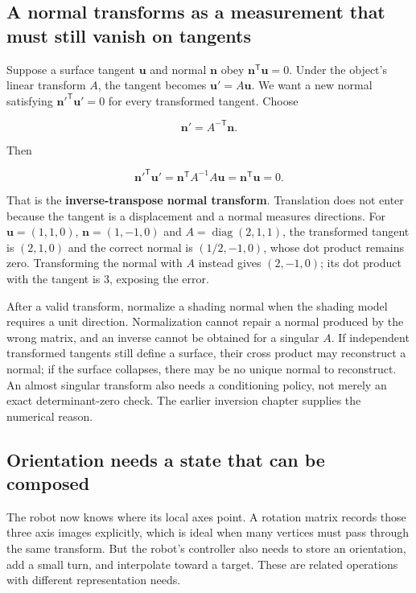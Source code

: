 \subsection{A normal transforms as a measurement that must still vanish on tangents}\label{a-normal-transforms-as-a-measurement-that-must-still-vanish-on-tangents}

Suppose a surface tangent \(\mathbf u\) and normal \(\mathbf n\) obey \(\mathbf n^{\mathsf T}\mathbf u=0\). Under the object's linear transform \(A\), the tangent becomes \(\mathbf u'=A\mathbf u\). We want a new normal satisfying \(\mathbf n'^{\mathsf T}\mathbf u'=0\) for every transformed tangent. Choose

\[
\mathbf n'=A^{-\mathsf T}\mathbf n.
\]

Then

\[
\mathbf n'^{\mathsf T}\mathbf u'
=\mathbf n^{\mathsf T}A^{-1}A\mathbf u
=\mathbf n^{\mathsf T}\mathbf u=0.
\]

That is the \textbf{inverse-transpose normal transform}. Translation does not enter because the tangent is a displacement and a normal measures directions. For \(\mathbf u=(1,1,0)\), \(\mathbf n=(1,-1,0)\) and \(A=\operatorname{diag}(2,1,1)\), the transformed tangent is \((2,1,0)\) and the correct normal is \((1/2,-1,0)\), whose dot product remains zero. Transforming the normal with \(A\) instead gives \((2,-1,0)\); its dot product with the tangent is \(3\), exposing the error.

After a valid transform, normalize a shading normal when the shading model requires a unit direction. Normalization cannot repair a normal produced by the wrong matrix, and an inverse cannot be obtained for a singular \(A\). If independent transformed tangents still define a surface, their cross product may reconstruct a normal; if the surface collapses, there may be no unique normal to reconstruct. An almost singular transform also needs a conditioning policy, not merely an exact determinant-zero check. The earlier inversion chapter supplies the numerical reason.

\subsection{Orientation needs a state that can be composed}\label{orientation-needs-a-state-that-can-be-composed}

The robot now knows where its local axes point. A rotation matrix records those three axis images explicitly, which is ideal when many vertices must pass through the same transform. But the robot's controller also needs to store an orientation, add a small turn, and interpolate toward a target. These are related operations with different representation needs.

